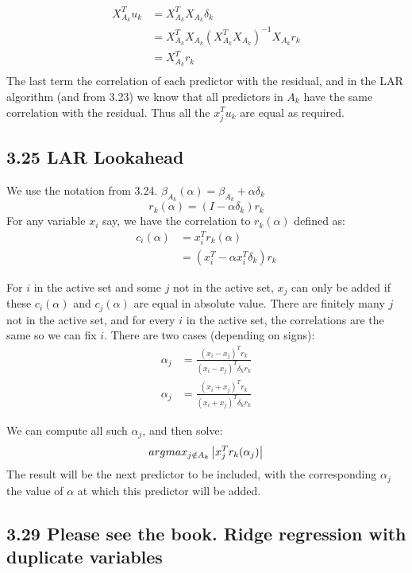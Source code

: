 \begin{align*}
    X_{A_k}^T u_k &= X_{A_k}^T X_{A_k}\delta_k\\
    &= X_{A_k}^T X_{A_k} \left(X_{A_k}^T X_{A_k}\right)^{-1} X_{A_k} r_k\\
    &= X_{A_k}^T r_k\\
\end{align*}
 The last term the correlation of each predictor with the residual, and in the LAR algorithm (and from 3.23) we know that all predictors in $A_k$ have the same correlation with the residual.
 Thus all the $x_j^T u_k$ are equal as required.

\subsection*{3.25 LAR Lookahead}

We use the notation from 3.24. $\beta_{A_k}(\alpha) = \beta_{A_k} + \alpha \delta_k$
$$r_k(\alpha) = \left(I - \alpha \delta_k\right) r_k$$
For any variable $x_i$ say, we have the correlation to $r_k(\alpha)$ defined as:
\begin{align*}
    c_i(\alpha) &= x_i^T r_k(\alpha)\\
    &= \left(x_i^T - \alpha x_i^T \delta_k\right) r_k
\end{align*}

For $i$ in the active set and some $j$ not in the active set, $x_j$ can only be added if these $c_i(\alpha)$ and $c_j(\alpha)$ are equal in absolute value. 
There are finitely many $j$ not in the active set, and for every $i$ in the active set, the correlations are the same so we can fix $i$.
There are two cases (depending on signs):
\begin{align*}
\alpha_j &= \frac{(x_i - x_j)^T r_k}{(x_i - x_j)^T\delta_k r_k}\\
\alpha_j &= \frac{(x_i + x_j)^T r_k}{(x_i + x_j)^T\delta_k r_k}
\end{align*}

We can compute all such $\alpha_j$, and then solve:
$$ argmax_{j \notin A_k} \left\vert x_j^T r_k(\alpha_j)\right\vert $$
The result will be the next predictor to be included, with the corresponding $\alpha_j$ the value of $\alpha$ at which this predictor will be added.






\subsection*{3.29 Please see the book. Ridge regression with duplicate variables}

